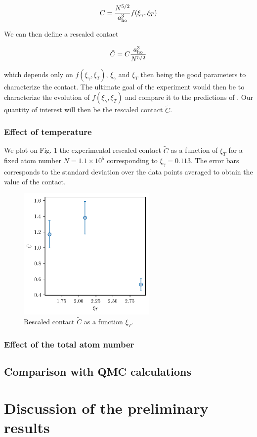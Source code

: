 \begin{equation}
    C= \frac{N^{5/2}}{a_{\rm{ho}}^3} f(\xi_{\gamma},\xi_{T})
\end{equation}

\noindent We can then define a rescaled contact

\begin{equation}
    \tilde{C}=C \frac{a_{\rm{ho}}^3}{N^{5/2}}
\end{equation}

\noindent which depends only on $f(\xi_{\gamma},\xi_{T})$, $\xi_{\gamma}$ and $\xi_{T}$ then being the good parameters to characterize the contact. The ultimate goal of the experiment would then be to characterize the evolution of $f(\xi_{\gamma},\xi_{T})$ and compare it to the predictions of \cite{yao2018tan}. Our quantity of interest will then be the rescaled contact $\tilde{C}$.

\subsubsection{Effect of temperature}

We plot on Fig.-\ref{fig:C_tilde_vs_T} the experimental rescaled contact $\tilde{C}$ as a function of $\xi_T$ for a fixed atom number $N=1.1 \times 10^5$ corresponding to $\xi_{\gamma}=0.113$. The error bars corresponds to the standard deviation over the data points averaged to obtain the value of the contact. 

\begin{figure}
    \centering
    \includegraphics[width=0.6\textwidth]{Fig/Chapter5/C_tilde_vs_T.png}
    \caption{Rescaled contact $\tilde{C}$ as a function $\xi_T$. }
    \label{fig:C_tilde_vs_T}
\end{figure}

\subsubsection{Effect of the total atom number}

\subsection{Comparison with QMC calculations}

\section{Discussion of the preliminary results}